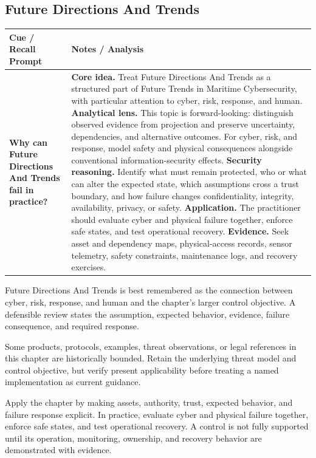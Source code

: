 \documentclass[11pt]{article}
\newcommand{\CornellHeader}{%
\rowcolor{Navy}\color{white}\bfseries Cue / Recall Prompt & \color{white}\bfseries Notes / Analysis\\\hline}
\newcommand{\CornellRow}[2]{%
\cellcolor{CueGray}\RaggedRight\textbf{#1} & \RaggedRight #2\\\hline}
\begin{document}
\subsection*{Future Directions And Trends}
\begin{longtable}{>{\RaggedRight\arraybackslash}p{}|>{\RaggedRight\arraybackslash}p{}}
\CornellHeader
\CornellRow{Why can Future Directions And Trends fail in practice?}{\textbf{Core idea.} Treat Future Directions And Trends as a structured part of Future Trends in Maritime Cybersecurity, with particular attention to cyber, risk, response, and human. \textbf{Analytical lens.} This topic is forward-looking: distinguish observed evidence from projection and preserve uncertainty, dependencies, and alternative outcomes. For cyber, risk, and response, model safety and physical consequences alongside conventional information-security effects. \textbf{Security reasoning.} Identify what must remain protected, who or what can alter the expected state, which assumptions cross a trust boundary, and how failure changes confidentiality, integrity, availability, privacy, or safety. \textbf{Application.} The practitioner should evaluate cyber and physical failure together, enforce safe states, and test operational recovery. \textbf{Evidence.} Seek asset and dependency maps, physical-access records, sensor telemetry, safety constraints, maintenance logs, and recovery exercises.}
\end{longtable}
\begin{topicsummary}
Future Directions And Trends is best remembered as the connection between cyber, risk, response, and human and the chapter's larger control objective. A defensible review states the assumption, expected behavior, evidence, failure consequence, and required response.
\end{topicsummary}
\begin{historybox}
Some products, protocols, examples, threat observations, or legal references in this chapter are historically bounded. Retain the underlying threat model and control objective, but verify present applicability before treating a named implementation as current guidance.
\end{historybox}
\begin{defensebox}
Apply the chapter by making assets, authority, trust, expected behavior, and failure response explicit. In practice, evaluate cyber and physical failure together, enforce safe states, and test operational recovery. A control is not fully supported until its operation, monitoring, ownership, and recovery behavior are demonstrated with evidence.
\end{defensebox}
\end{document}
